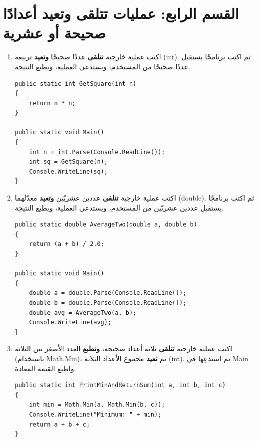 \documentclass[14pt]{extarticle}
\begin{document}
\filbreak
\section*{القسم الرابع: عمليات تتلقى وتعيد أعدادًا صحيحة أو عشرية}

\begin{enumerate}[resume, itemsep=1em]

\item اكتب عملية خارجية \textbf{تتلقى} عددًا صحيحًا \textbf{وتعيد} تربيعه (\textenglish{int}). ثم اكتب برنامجًا يستقبل عددًا صحيحًا من المستخدم، ويستدعي العملية، ويطبع النتيجة.
\ifwithsols
\begin{boxSolution}
\begin{english}
\begin{verbatim}
public static int GetSquare(int n)
{
    return n * n;
}

public static void Main()
{
    int n = int.Parse(Console.ReadLine());
    int sq = GetSquare(n);
    Console.WriteLine(sq);
}
\end{verbatim}
\end{english}
\end{boxSolution}
\fi
\filbreak

\item اكتب عملية خارجية \textbf{تتلقى} عددين عشريّين \textbf{وتعيد} معدّلهما (\textenglish{double}). ثم اكتب برنامجًا يستقبل عددين عشريّين من المستخدم، ويستدعي العملية، ويطبع النتيجة.
\ifwithsols
\begin{boxSolution}
\begin{english}
\begin{verbatim}
public static double AverageTwo(double a, double b)
{
    return (a + b) / 2.0;
}

public static void Main()
{
    double a = double.Parse(Console.ReadLine());
    double b = double.Parse(Console.ReadLine());
    double avg = AverageTwo(a, b);
    Console.WriteLine(avg);
}
\end{verbatim}
\end{english}
\end{boxSolution}
\fi
\filbreak

\item اكتب عملية خارجية \textbf{تتلقى} ثلاثة أعداد صحيحة، \textbf{وتطبع} العدد الأصغر بين الثلاثة (باستخدام \textenglish{Math.Min})، ثم \textbf{تعيد} مجموع الأعداد الثلاثة (\textenglish{int}). ثم استدعِها في \textenglish{Main} واطبع القيمة المعادة.
\ifwithsols
\begin{boxSolution}
\begin{english}
\begin{verbatim}
public static int PrintMinAndReturnSum(int a, int b, int c)
{
    int min = Math.Min(a, Math.Min(b, c));
    Console.WriteLine("Minimum: " + min);
    return a + b + c;
}


\end{verbatim}
\end{english}
\end{boxSolution}
\end{enumerate}
\end{document}
